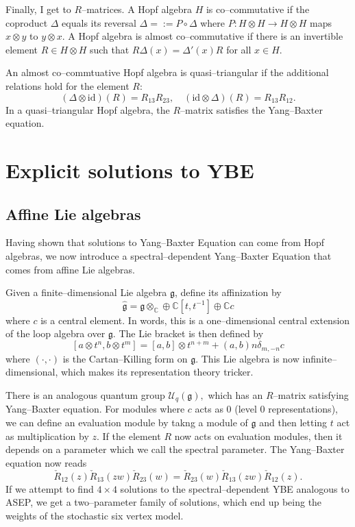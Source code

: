\documentclass{ximera}
\begin{document}
Finally, I get to $R$--matrices. A Hopf algebra $H$ is co--commutative if the coproduct $\Delta$ equals its reversal
$\Delta=:=P \circ \Delta$ where $P: H \otimes H \rightarrow H \otimes H$ maps $x\otimes y$ to $y \otimes x.$ 
A Hopf algebra is almost co--commutative if there is an invertible element $R \in H \otimes H$ such that 
$R \Delta(x) = \Delta'(x) R$ for all $x \in H.$

An almost co--commtuative Hopf algebra is quasi--triangular if the additional relations hold for the element $R$: 
$$
(\Delta \otimes \mathrm{id})(R) = R_{13}R_{23}, \quad (\mathrm{id} \otimes \Delta)(R) = R_{13}R_{12}.
$$
In a quasi--triangular Hopf algebra, the $R$--matrix satisfies the Yang--Baxter equation.


\section{Explicit solutions to YBE}

\subsection{Affine Lie algebras}
Having shown that solutions to Yang--Baxter Equation can come from Hopf algebras, we now introduce a 
spectral--dependent Yang--Baxter Equation that comes from affine Lie algebras. 

Given a finite--dimensional Lie algebra $\mathfrak{g}$, define its affinization by
$$
\hat{\mathfrak{g}} = \mathfrak{g} \otimes_{\mathbb{C}} \oplus \mathbb{C}[t,t^{-1}] \oplus \mathbb{C}c
$$
where $c$ is a central element. In words, this is a one--dimensional central extension of the loop algebra
over $\mathfrak{g}.$ The Lie bracket is then defined by 
$$
[a\otimes t^n, b\otimes t^m] = [a,b] \otimes t^{n+m} + (a,b)n\delta_{m,-n}c
$$
where $(\cdot,\cdot)$ is the Cartan--Killing form on $\mathfrak{g}.$ This Lie algebra is now
infinite--dimensional, which makes its representation theory tricker. 

There is an analogous quantum group $\mathcal{U}_q(\mathfrak{g}),$ which has an $R$--matrix satisfying
Yang--Baxter equation. For modules where $c$ acts as $0$ (level $0$ representations), we can define an
evaluation module by takng a module of $\mathfrak{g}$ and then letting $t$ act as multiplication by $z$. 
If the element $R$ now acts on evaluation modules, then it depends on a parameter which we call the 
spectral parameter. The Yang--Baxter equation now reads
$$
\check{R}_{12}(z) \check{R}_{13}(zw) \check{R}_{23}(w) = \check{R}_{23}(w) \check{R}_{13}(zw) \check{R}_{12}(z).
$$
If we attempt to find $4\times 4$ solutions to the spectral--dependent YBE analogous to ASEP, we get
a two--parameter family of solutions, which end up being the weights of the stochastic six vertex model.
\end{document}
